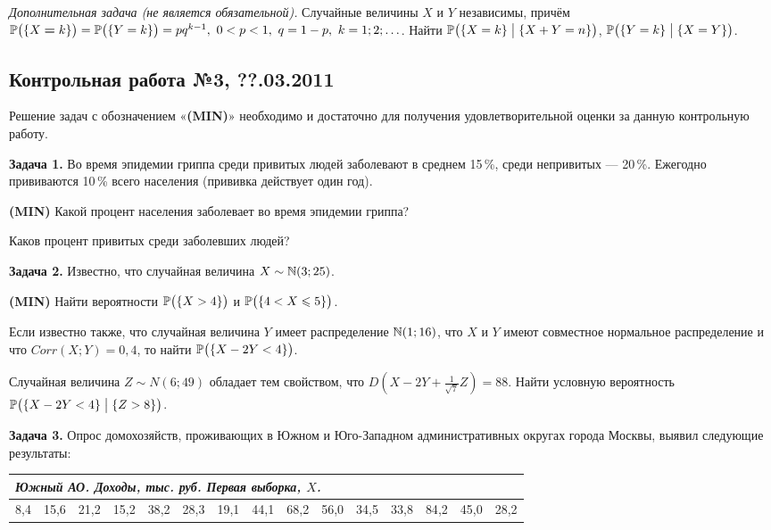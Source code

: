 \documentclass[12pt, a4paper]{article}\usepackage[]{graphicx}\usepackage[]{color}
\newenvironment{enumerate*}{
	\begin{enumerate}
		\setlength{\itemsep}{0pt}
		\setlength{\parskip}{0pt}
		\setlength{\parsep}{0pt}
	}{\end{enumerate}}
\newcommand{\MIN}{\textbf{(MIN)}{}}
\begin{document}
	\emph{Дополнительная задача (не является обязательной).} Случайные величины $X$ и $Y$ независимы, причём $\P\bigl(\{X\hm=k\}\bigr)=\P\bigl(\{Y=k\}\bigr)=pq^{k-1},\ 0<p<1,\ q=1-p,\ k=1;2;\ldots$. Найти $\P\bigl(\{X=k\} \bigm| \{X+Y=n\}\bigr)$, $\P\bigl(\{Y=k\}\bigm| \{X=Y\}\bigr)$.

	\subsection{Контрольная работа №3, ??.03.2011}

	Решение задач с обозначением «\MIN{}» необходимо и достаточно для получения удовлетворительной оценки за данную контрольную работу.\par\smallskip

	\textbf{Задача 1.} Во время эпидемии гриппа среди привитых людей заболевают в среднем 15\,\%, среди непривитых — 20\,\%. Ежегодно прививаются 10\,\% всего населения (прививка действует один год).
	\begin{enumerate*}
		\item \MIN{} Какой процент населения заболевает во время эпидемии гриппа?
		\item Каков процент привитых среди заболевших людей?
	\end{enumerate*}

	\textbf{Задача 2.} Известно, что случайная величина $X\sim\N(3;25)$.
	\begin{enumerate*}
		\item \MIN{} Найти вероятности $\P\bigl(\{X>4\}\bigr)$ и $\P\bigl(\{4<X\leqslant 5\}\bigr)$.
		\item Если известно также, что случайная величина $Y$ имеет распределение $\N(1;16)$, что $X$ и $Y$ имеют совместное нормальное распределение и что $Corr(X;Y)=0{,}4$, то найти $\P\bigl(\{X-2Y<4\}\bigr)$.
		\item Случайная величина $Z\sim N(6;49)$ обладает тем свойством, что $D\left(X-2Y+\frac{1}{\sqrt{7}}Z\right)=88$. Найти условную вероятность $\P\bigl(\{X-2Y<4\} \bigm| \{Z>8\}\bigr)$.
	\end{enumerate*}

	\textbf{Задача 3.} Опрос домохозяйств, проживающих в Южном и Юго-Западном административных округах города Москвы, выявил следующие результаты:
	\par\smallskip
	\begin{tabular}{|p{6mm}|p{6mm}|p{6mm}|p{6mm}|p{6mm}|p{6mm}|p{6mm}|p{6mm}|p{6mm}|p{6mm}|p{6mm}|p{6mm}|p{6mm}|p{6mm}|p{6mm}|}
		\multicolumn{15}{l}{\emph{Южный АО. Доходы, тыс. руб. Первая выборка, $X$.}}\\ \hline
		8{,}4 & 15{,}6 & 21{,}2 & 15{,}2 & 38{,}2 & 28{,}3 & 19{,}1 & 44{,}1 & 68{,}2 & 56{,}0 & 34{,}5 & 33{,}8 & 84{,}2 & 45{,}0 & 28{,}2 \\ \hline
	\end{tabular}\par\smallskip
\end{document}
